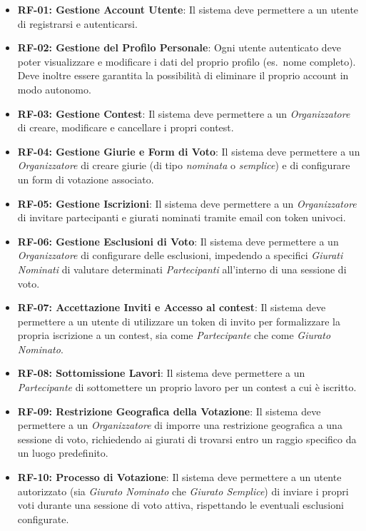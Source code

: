\begin{itemize}
    \item \textbf{RF-01: Gestione Account Utente}: Il sistema deve permettere a un utente di registrarsi e autenticarsi.
    \item \textbf{RF-02: Gestione del Profilo Personale}: Ogni utente autenticato deve poter visualizzare e modificare i dati del proprio profilo (es.\ nome completo).
    Deve inoltre essere garantita la possibilità di eliminare il proprio account in modo autonomo.
    \item \textbf{RF-03: Gestione Contest}: Il sistema deve permettere a un \emph{Organizzatore} di creare, modificare e cancellare i propri contest.
    \item \textbf{RF-04: Gestione Giurie e Form di Voto}: Il sistema deve permettere a un \emph{Organizzatore} di creare giurie (di tipo \emph{nominata} o \emph{semplice}) e di configurare un form di votazione associato.
    \item \textbf{RF-05: Gestione Iscrizioni}: Il sistema deve permettere a un \emph{Organizzatore} di invitare partecipanti e giurati nominati tramite email con token univoci.
    \item \textbf{RF-06: Gestione Esclusioni di Voto}: Il sistema deve permettere a un \emph{Organizzatore} di configurare delle esclusioni, impedendo a specifici \emph{Giurati Nominati} di valutare determinati \emph{Partecipanti} all'interno di una sessione di voto.
    \item \textbf{RF-07: Accettazione Inviti e Accesso al contest}: Il sistema deve permettere a un utente di utilizzare un token di invito per formalizzare la propria iscrizione a un contest, sia come \emph{Partecipante} che come \emph{Giurato Nominato}.
    \item \textbf{RF-08: Sottomissione Lavori}: Il sistema deve permettere a un \emph{Partecipante} di sottomettere un proprio lavoro per un contest a cui è iscritto.
    \item \textbf{RF-09: Restrizione Geografica della Votazione}: Il sistema deve permettere a un \emph{Organizzatore} di imporre una restrizione geografica a una sessione di voto, richiedendo ai giurati di trovarsi entro un raggio specifico da un luogo predefinito.
    \item \textbf{RF-10: Processo di Votazione}: Il sistema deve permettere a un utente autorizzato (sia \emph{Giurato Nominato} che \emph{Giurato Semplice}) di inviare i propri voti durante una sessione di voto attiva, rispettando le eventuali esclusioni configurate.

\end{itemize}

